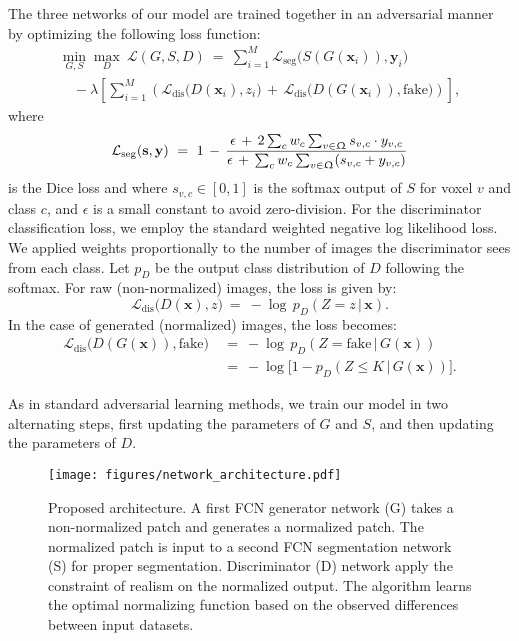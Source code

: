 \documentclass[preprint,12pt]{elsarticle}
\renewcommand{\vec}[1]{\mathbf{#1}}
\newcommand{\mr}[1]{\mathrm{#1}}
\newcommand{\yy}{\vec{y}}
\newcommand{\xx}{\vec{x}}
\newcommand{\sss}{\vec{s}}
\newcommand{\loss}{\mathcal{L}}
\newcommand{\lossSeg}{\loss_{\mr{seg}}}
\newcommand{\lossDis}{\loss_{\mr{dis}}}
\newcommand{\img}{\Upomega}
\begin{document}
The three networks of our model are trained together in an adversarial manner by optimizing the following loss function:
\begin{multline*}
    \min_{G,S} \max_{D} \ \loss(G, S, D) \ = \ \sum_{i=1}^{M} \lossSeg \big(S(G(\xx_i)), \yy_i\big)  \\ \quad -
    \lambda\left[\sum_{i=1}^{M} \left( \lossDis\big(D(\xx_i), z_i\big) \, + \, \lossDis\big(D(G(\xx_i)), \mr{fake}\big)\right )\right]\nonumber, %
\label{eq:total_loss}
\end{multline*}
where
\begin{equation}
    \lossSeg (\sss,\yy) \ = \ 1 \, - \, \frac{\epsilon \, + \, 2 \sum_{c} w_c \sum_{v \in \img} s_{v,c} \cdot y_{v,c}}{\epsilon \, + \, \sum_{c} w_c \sum_{v \in \img} (s_{v,c} +  y_{v,c})}
\end{equation}
is the Dice loss and where $s_{v,c} \in [0, 1]$ is the softmax output of $S$ for voxel $v$ and class $c$, and $\epsilon$ is a small constant to avoid zero-division. For the discriminator classification loss, we employ the standard weighted negative log likelihood loss. We applied weights proportionally to the number of images the discriminator sees from each class. Let $p_D$ be the output class distribution of $D$ following the softmax. For raw (non-normalized) images, the loss is given by:
%
\begin{equation}
    \lossDis\big(D(\xx), z\big) \ = \ - \log \, p_D(Z = z \, | \, \xx).
\end{equation}In the case of generated (normalized) images, the loss becomes:
%
\begin{align}
    \lossDis\big(D(G(\xx)), \mr{fake}\big) & \ = \
        - \log \, p_D(Z = \mr{fake} \, | \, G(\xx)) \\
        & \ = \ - \log \big[1 - p_D(Z \leq K \, | \, G(\xx))\big]\nonumber.
\end{align}

As in standard adversarial learning methods, we train our model in two alternating steps, first updating the parameters of $G$ and $S$, and then updating the parameters of $D$.

\begin{figure*}
    \begin{center}
        \texttt{[image: figures/network\_architecture.pdf]}
        \caption{Proposed architecture. A first FCN generator network (G) takes a non-normalized patch and generates a normalized patch. The normalized patch is input to a second FCN segmentation network (S) for proper segmentation. Discriminator (D) network apply the constraint of realism on the normalized output. The algorithm learns the optimal normalizing function based on the observed differences between input datasets.}
    \end{center}
\end{figure*}
\end{document}
